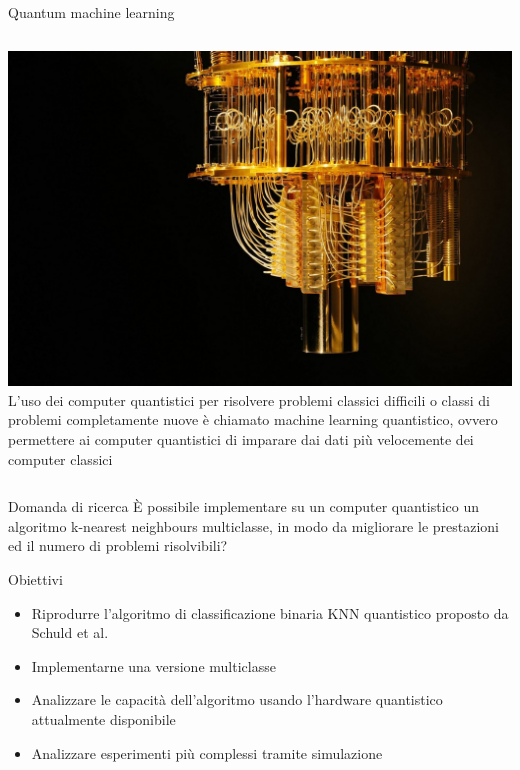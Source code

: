 \documentclass{beamer}
\begin{document}
    \begin{frame}{Quantum machine learning}
        \begin{columns}
            \includegraphics[width=\textwidth]{gfx/quantum-computer.jpg}
            L'uso dei computer quantistici per risolvere problemi classici difficili o classi di problemi completamente nuove è chiamato machine learning quantistico, 
            ovvero permettere ai computer quantistici di imparare dai dati più velocemente dei computer classici
        \end{columns}
    \end{frame}

    \begin{frame}{Domanda di ricerca}
        È possibile implementare su un computer quantistico un 
        algoritmo k-nearest neighbours multiclasse, in modo da 
        migliorare le prestazioni ed il numero di problemi risolvibili? 
    \end{frame}

    \begin{frame}{Obiettivi}
        \begin{itemize}
            \item Riprodurre l'algoritmo di classificazione binaria KNN quantistico proposto da Schuld et al. 
            \item Implementarne una versione multiclasse
            \item Analizzare le capacità dell'algoritmo usando l'hardware quantistico attualmente disponibile
            \item Analizzare esperimenti più complessi tramite simulazione
        \end{itemize}
    \end{frame}
\end{document}
